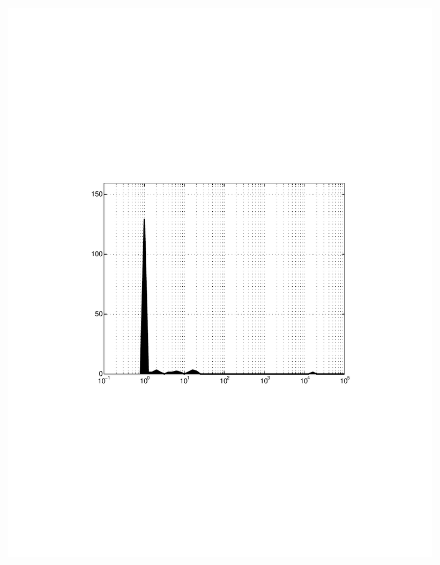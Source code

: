 \documentclass{article}
\begin{document}
\begin{figure}
\begin{minipage}{0.45 \textwidth}
\includegraphics[width=1.00 \textwidth]{images/results_matrixmarket_resB_003.pdf}
\end{minipage}
\begin{minipage}{0.45 \textwidth}

\end{minipage}
\end{figure}
\end{document}
